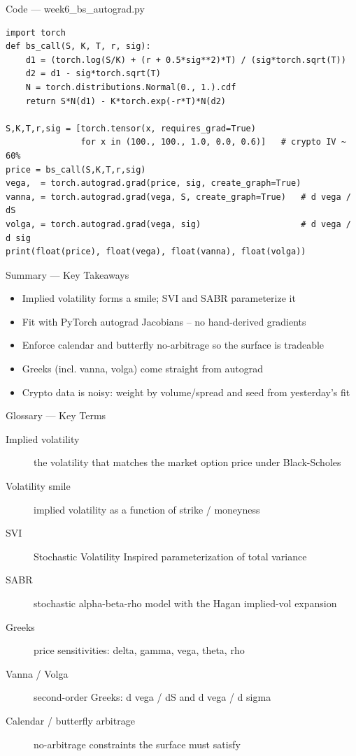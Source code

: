 \documentclass[aspectratio=169,10pt]{beamer}
\begin{document}
\begin{frame}[fragile]{Code --- week6\_bs\_autograd.py}
\begin{lstlisting}
import torch
def bs_call(S, K, T, r, sig):
    d1 = (torch.log(S/K) + (r + 0.5*sig**2)*T) / (sig*torch.sqrt(T))
    d2 = d1 - sig*torch.sqrt(T)
    N = torch.distributions.Normal(0., 1.).cdf
    return S*N(d1) - K*torch.exp(-r*T)*N(d2)

S,K,T,r,sig = [torch.tensor(x, requires_grad=True)
               for x in (100., 100., 1.0, 0.0, 0.6)]   # crypto IV ~ 60%
price = bs_call(S,K,T,r,sig)
vega,  = torch.autograd.grad(price, sig, create_graph=True)
vanna, = torch.autograd.grad(vega, S, create_graph=True)   # d vega / dS
volga, = torch.autograd.grad(vega, sig)                    # d vega / d sig
print(float(price), float(vega), float(vanna), float(volga))
\end{lstlisting}
\end{frame}
\begin{frame}{Summary --- Key Takeaways}
\begin{itemize}
  \item Implied volatility forms a smile; SVI and SABR parameterize it
  \item Fit with PyTorch autograd Jacobians -- no hand-derived gradients
  \item Enforce calendar and butterfly no-arbitrage so the surface is tradeable
  \item Greeks (incl. vanna, volga) come straight from autograd
  \item Crypto data is noisy: weight by volume/spread and seed from yesterday's fit
\end{itemize}
\end{frame}

\begin{frame}{Glossary --- Key Terms}
\footnotesize\begin{description}
\item[\color{ncsured}Implied volatility] the volatility that matches the market option price under Black-Scholes
\item[\color{ncsured}Volatility smile] implied volatility as a function of strike / moneyness
\item[\color{ncsured}SVI] Stochastic Volatility Inspired parameterization of total variance
\item[\color{ncsured}SABR] stochastic alpha-beta-rho model with the Hagan implied-vol expansion
\item[\color{ncsured}Greeks] price sensitivities: delta, gamma, vega, theta, rho
\item[\color{ncsured}Vanna / Volga] second-order Greeks: d vega / dS and d vega / d sigma
\item[\color{ncsured}Calendar / butterfly arbitrage] no-arbitrage constraints the surface must satisfy
\end{description}
\end{frame}
\end{document}
